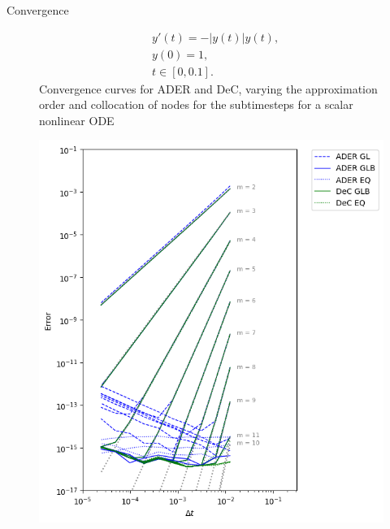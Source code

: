 \documentclass[aspectratio=169]{beamer}
\begin{document}
\begin{frame}{Convergence}

\begin{figure}
\begin{minipage}[c]{0.55\linewidth}
\begin{equation}
\label{eq:scalar-nonlinear}
\begin{split}
&y'(t) = - |y(t)| y(t) ,\\
&y(0) = 1,\\
&t\in [0,0.1].
\end{split}
\end{equation}
Convergence curves for ADER and DeC, varying the approximation order and collocation of nodes for the subtimesteps for a scalar nonlinear ODE 
\end{minipage}
\hfill
\begin{minipage}[c]{0.4\linewidth}
\includegraphics[width=\linewidth]{scalar-2.png}
\end{minipage}%
\end{figure}


\end{frame}
\end{document}
